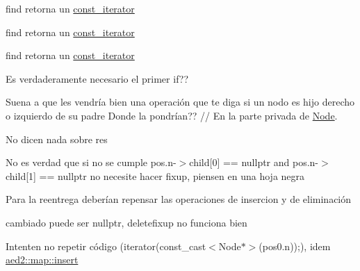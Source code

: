 
\begin{DoxyRefList}
\item[\label{deprecated__deprecated000006}%
\hypertarget{deprecated__deprecated000006}{}%
Miembro \hyperlink{classaed2_1_1map_a0b0a11f906da2926f9eb342fcee79fd7_a0b0a11f906da2926f9eb342fcee79fd7}{aed2\+:\+:map$<$ Key, Meaning, Compare $>$\+:\+:at} (const Key \&key) const ]find retorna un \hyperlink{classaed2_1_1map_1_1const__iterator}{const\+\_\+iterator} 

find retorna un \hyperlink{classaed2_1_1map_1_1const__iterator}{const\+\_\+iterator} 

find retorna un \hyperlink{classaed2_1_1map_1_1const__iterator}{const\+\_\+iterator}  
\item[\label{deprecated__deprecated000019}%
\hypertarget{deprecated__deprecated000019}{}%
Miembro \hyperlink{classaed2_1_1map_a2bfa5165825979bf2431db55bc6bc9ca_a2bfa5165825979bf2431db55bc6bc9ca}{aed2\+:\+:map$<$ Key, Meaning, Compare $>$\+:\+:clear} ()]Es verdaderamente necesario el primer if?? 
\item[\label{deprecated__deprecated000022}%
\hypertarget{deprecated__deprecated000022}{}%
Miembro \hyperlink{classaed2_1_1map_a8fc6c73e0fcd59ae86887300b7287d9f_a8fc6c73e0fcd59ae86887300b7287d9f}{aed2\+:\+:map$<$ Key, Meaning, Compare $>$\+:\+:delete\+Fix\+Up} (\hyperlink{structaed2_1_1map_1_1Node}{Node} $\ast$padre\+\_\+nodo, \hyperlink{structaed2_1_1map_1_1Node}{Node} $\ast$hijo\+\_\+nodo)]Suena a que les vendría bien una operación que te diga si un nodo es hijo derecho o izquierdo de su padre Donde la pondrían?? // En la parte privada de \hyperlink{structaed2_1_1map_1_1Node}{Node}. 
\item[\label{deprecated__deprecated000016}%
\hypertarget{deprecated__deprecated000016}{}%
Miembro \hyperlink{classaed2_1_1map_ad8e796bf9c9c558e5ce6b61e116253fe_ad8e796bf9c9c558e5ce6b61e116253fe}{aed2\+:\+:map$<$ Key, Meaning, Compare $>$\+:\+:erase} (\hyperlink{classaed2_1_1map_1_1const__iterator}{const\+\_\+iterator} pos)]No dicen nada sobre res 

No es verdad que si no se cumple pos.\+n-\/$>$child\mbox{[}0\mbox{]} == nullptr and pos.\+n-\/$>$child\mbox{[}1\mbox{]} == nullptr no necesite hacer fixup, piensen en una hoja negra 

Para la reentrega deberían repensar las operaciones de insercion y de eliminación 

cambiado puede ser nullptr, deletefixup no funciona bien

Intenten no repetir código (iterator(const\+\_\+cast$<$\+Node$\ast$$>$(pos0.\+n));), idem \hyperlink{classaed2_1_1map_a6941cde9a79c27f054b5c97a587a1854_a6941cde9a79c27f054b5c97a587a1854}{aed2\+::map\+::insert} 


\end{DoxyRefList}
